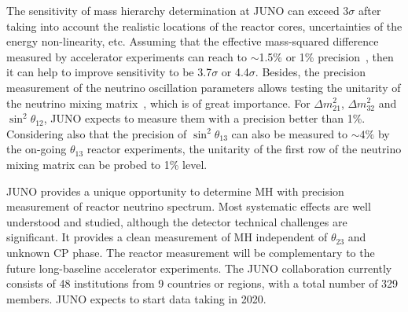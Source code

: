 The sensitivity of mass hierarchy determination at JUNO can exceed 3$\sigma$ after taking into account the realistic locations of the reactor cores, uncertainties of the energy non-linearity, etc. Assuming that the effective mass-squared difference measured by accelerator experiments can reach to $\sim$1.5\% or 1\% precision~\cite{Agarwalla}, then it can help to improve sensitivity to be 3.7$\sigma$ or 4.4$\sigma$\cite{Li-PRD13}. Besides, the precision measurement of the neutrino oscillation parameters allows testing the unitarity of the neutrino mixing matrix~\cite{unitarity13}, which is of great importance. For $\Delta m^2_{21}$, $\Delta m^2_{32}$ and $\sin^2\theta_{12}$, JUNO expects to measure them with a precision better than 1\%. Considering also that the precision of $\sin^2\theta_{13}$ can also be measured to $\sim4\%$ by the on-going $\theta_{13}$ reactor experiments, the unitarity of the first row of the neutrino mixing matrix can be probed to 1\% level.

JUNO provides a unique opportunity to determine MH with precision measurement of reactor neutrino spectrum. Most systematic effects are well understood and studied, although the detector technical challenges are significant. It provides a clean measurement of MH independent of $\theta_{23}$ and unknown CP phase. The reactor measurement will be complementary to the future long-baseline accelerator experiments. The JUNO collaboration currently consists of 48 institutions from 9 countries or regions, with a total number of 329 members. JUNO expects to start data taking in 2020.

